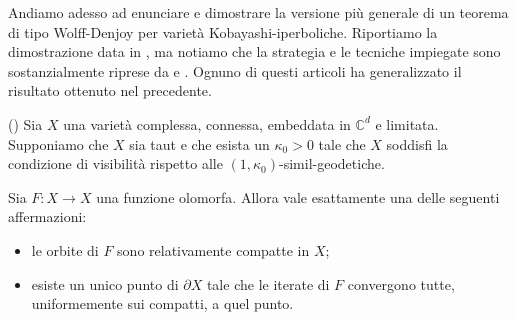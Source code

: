 Andiamo adesso ad enunciare e dimostrare la versione più generale di un teorema di tipo Wolff-Denjoy per varietà Kobayashi-iperboliche. Riportiamo la dimostrazione data in \cite{CMS}, ma notiamo che la strategia e le tecniche impiegate sono sostanzialmente riprese da \cite{BZ1} e \cite{BM}. Ognuno di questi articoli ha generalizzato il risultato ottenuto nel precedente.

\begin{thm}
    (\cite[Theorem 1.15]{CMS}) Sia $X$ una varietà complessa, connessa, embeddata in $\mathbb{C}^d$ e limitata. Supponiamo che $X$ sia taut e che esista un $\kappa_0>0$ tale che $X$ soddisfi la condizione di visibilità rispetto alle $(1,\kappa_0)$-simil-geodetiche.
    
    Sia $F:X \longrightarrow X$ una funzione olomorfa. Allora vale esattamente una delle seguenti affermazioni:
    \begin{itemize}
        \item le orbite di $F$ sono relativamente compatte in $X$;
        \item esiste un unico punto di $\partial X$ tale che le iterate di $F$ convergono tutte, uniformemente sui compatti, a quel punto.
    \end{itemize}
\end{thm}

